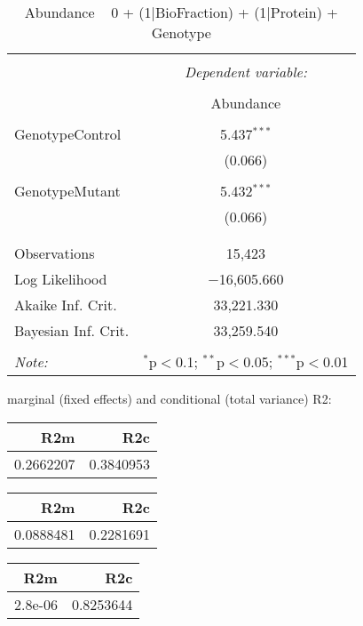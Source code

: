 \documentclass[11pt]{report}
\begin{document}
\begin{table}[!htbp] \centering 
  \caption{Abundance ~ 0 + (1|BioFraction) + (1|Protein) + Genotype} 
  \label{} 
\begin{tabular}{@{\extracolsep{5pt}}lc} 
\\[-1.8ex]\hline 
\hline \\[-1.8ex] 
 & \multicolumn{1}{c}{\textit{Dependent variable:}} \\ 
\cline{2-2} 
\\[-1.8ex] & Abundance \\ 
\hline \\[-1.8ex] 
 GenotypeControl & 5.437$^{***}$ \\ 
  & (0.066) \\ 
  & \\ 
 GenotypeMutant & 5.432$^{***}$ \\ 
  & (0.066) \\ 
  & \\ 
\hline \\[-1.8ex] 
Observations & 15,423 \\ 
Log Likelihood & $-$16,605.660 \\ 
Akaike Inf. Crit. & 33,221.330 \\ 
Bayesian Inf. Crit. & 33,259.540 \\ 
\hline 
\hline \\[-1.8ex] 
\textit{Note:}  & \multicolumn{1}{r}{$^{*}$p$<$0.1; $^{**}$p$<$0.05; $^{***}$p$<$0.01} \\ 
\end{tabular} 
\end{table} 
marginal (fixed effects) and conditional (total variance) R2:

\begin{tabular}{r|r}
\hline
R2m & R2c\\
\hline
0.2662207 & 0.3840953\\
\hline
\end{tabular}

\begin{tabular}{r|r}
\hline
R2m & R2c\\
\hline
0.0888481 & 0.2281691\\
\hline
\end{tabular}

\begin{tabular}{r|r}
\hline
R2m & R2c\\
\hline
2.8e-06 & 0.8253644\\
\hline
\end{tabular}
\end{document}
